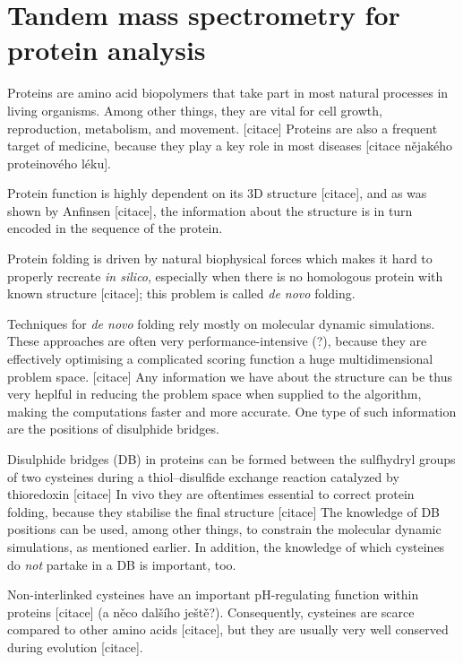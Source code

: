 \chapter{Tandem mass spectrometry for protein analysis}\label{chap:msms}


Proteins are amino acid biopolymers that take part in most natural processes in living organisms. Among other things, they are vital for cell growth, reproduction, metabolism, and movement. [citace] Proteins are also a frequent target of medicine, because they play a key role in most diseases [citace nějakého proteinového léku].

Protein function is highly dependent on its 3D structure [citace], and as was shown by Anfinsen [citace], the information about the structure is in turn encoded in the sequence of the protein.

Protein folding is driven by natural biophysical forces which makes it hard to properly recreate \emph{in silico}, especially when there is no homologous protein with known structure [citace]; this problem is called \emph{de novo} folding.

Techniques for \emph{de novo} folding rely mostly on molecular dynamic simulations. These approaches are often very performance-intensive (?), because they are effectively optimising a complicated scoring function a huge multidimensional problem space. [citace] Any information we have about the structure can be thus very heplful in reducing the problem space when supplied to the algorithm, making the computations faster and more accurate. One type of such information are the positions of disulphide bridges.

Disulphide bridges (DB) in proteins can be formed between the sulfhydryl groups of two cysteines during a thiol–disulfide exchange reaction catalyzed by thioredoxin [citace] In vivo they are oftentimes essential to correct protein folding, because they stabilise the final structure [citace] The knowledge of DB positions can be used, among other things, to constrain the molecular dynamic simulations, as mentioned earlier. In addition, the knowledge of which cysteines do \emph{not} partake in a DB is important, too.

Non-interlinked cysteines have an important pH-regulating function within proteins [citace] (a něco dalšího ještě?). Consequently, cysteines are scarce compared to other amino acids [citace], but they are usually very well conserved during evolution [citace].

